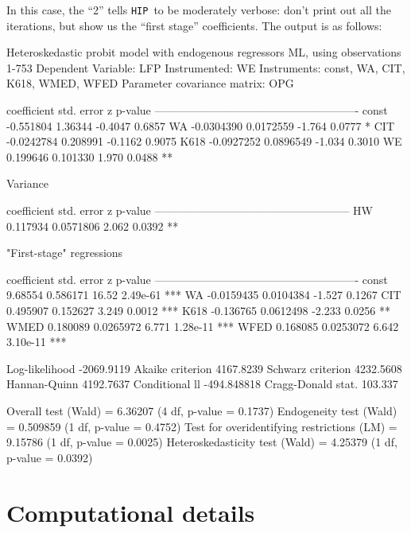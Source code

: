 \documentclass[a4paper,10pt]{article}
\newcommand{\HIP}{\texttt{HIP}}
\begin{document}
In this case, the ``2'' tells \HIP\ to be moderately verbose: don't
print out all the iterations, but show us the ``first stage''
coefficients. The output is as follows:

\begin{code}
Heteroskedastic probit model with endogenous regressors
ML, using observations 1-753
Dependent Variable: LFP 
Instrumented: WE
Instruments: const, WA, CIT, K618, WMED, WFED 
Parameter covariance matrix: OPG

             coefficient   std. error      z      p-value
  -------------------------------------------------------
  const      -0.551804     1.36344      -0.4047   0.6857 
  WA         -0.0304390    0.0172559    -1.764    0.0777  *
  CIT        -0.0242784    0.208991     -0.1162   0.9075 
  K618       -0.0927252    0.0896549    -1.034    0.3010 
  WE          0.199646     0.101330      1.970    0.0488  **

Variance 

             coefficient   std. error     z     p-value
  -----------------------------------------------------
  HW          0.117934     0.0571806    2.062   0.0392  **

"First-stage" regressions

             coefficient   std. error     z      p-value 
  -------------------------------------------------------
  const       9.68554      0.586171     16.52    2.49e-61 ***
  WA         -0.0159435    0.0104384    -1.527   0.1267  
  CIT         0.495907     0.152627      3.249   0.0012   ***
  K618       -0.136765     0.0612498    -2.233   0.0256   **
  WMED        0.180089     0.0265972     6.771   1.28e-11 ***
  WFED        0.168085     0.0253072     6.642   3.10e-11 ***

Log-likelihood       -2069.9119  Akaike criterion    4167.8239
Schwarz criterion     4232.5608  Hannan-Quinn        4192.7637
Conditional ll      -494.848818  Cragg-Donald stat.    103.337

Overall test (Wald) = 6.36207 (4 df, p-value = 0.1737)
Endogeneity test (Wald) = 0.509859 (1 df, p-value = 0.4752)
Test for overidentifying restrictions (LM) = 9.15786 (1 df, p-value = 0.0025)
Heteroskedasticity test (Wald) = 4.25379 (1 df, p-value = 0.0392)
\end{code}

\section{Computational details}
\end{document}
